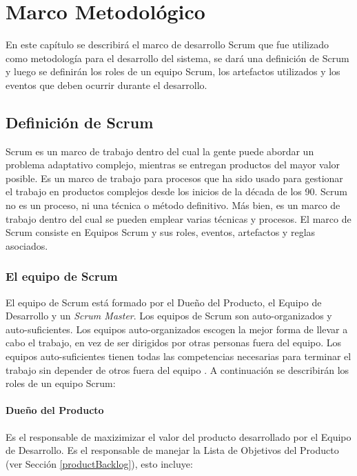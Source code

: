 \chapter{Marco Metodológico} \label{marcoMetodologico}

En este capítulo se describirá el marco de desarrollo Scrum que fue utilizado como metodología para el desarrollo del sistema, se dará una definición de Scrum y luego se definirán los roles de un equipo Scrum, los artefactos utilizados y los eventos que deben ocurrir durante el desarrollo.

\section{Definición de Scrum}
Scrum \cite{scrumSchwaber} es un marco de trabajo dentro del cual la gente puede abordar un problema adaptativo complejo, mientras se entregan productos del mayor valor posible. Es un marco de trabajo para procesos que ha sido usado para gestionar el trabajo en productos complejos desde los inicios de la década de los 90. Scrum no es un proceso, ni una técnica o método definitivo. Más bien, es un marco de trabajo dentro del cual se pueden emplear varias técnicas y procesos. El marco de Scrum consiste en Equipos Scrum y sus roles, eventos, artefactos y reglas asociados.

\subsection{El equipo de Scrum}
El equipo de Scrum está formado por el Dueño del Producto, el Equipo de Desarrollo y un \emph{Scrum Master}. Los equipos de Scrum son auto-organizados y auto-suficientes. Los equipos auto-organizados escogen la mejor forma de llevar a cabo el trabajo, en vez de ser dirigidos por otras personas fuera del equipo. Los equipos auto-suficientes tienen todas las competencias necesarias para terminar el trabajo sin depender de otros fuera del equipo \cite{scrumSchwaber}. A continuación se describirán los roles de un equipo Scrum:

\subsubsection{Dueño del Producto} \label{productOwner}
Es el responsable de maxizimizar el valor del producto desarrollado por el Equipo de Desarrollo. Es el responsable de manejar la Lista de Objetivos del Producto (ver Sección \ref{productBacklog}), esto incluye:

